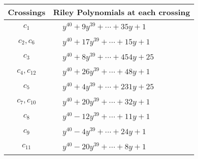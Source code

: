 \documentclass[1p]{elsarticle_modified}
\theoremstyle{definition}
\begin{document}
\begin{tabular}{m{50pt}|m{274pt}}
Crossings & \hspace{64pt}Riley Polynomials at each crossing \\
\hline $$\begin{aligned}c_{1}\end{aligned}$$&$\begin{aligned}
&y^{40}+9 y^{39}+\cdots+35 y+1
\end{aligned}$\\
\hline $$\begin{aligned}c_{2},c_{6}\end{aligned}$$&$\begin{aligned}
&y^{40}+17 y^{39}+\cdots+15 y+1
\end{aligned}$\\
\hline $$\begin{aligned}c_{3}\end{aligned}$$&$\begin{aligned}
&y^{40}+8 y^{39}+\cdots+454 y+25
\end{aligned}$\\
\hline $$\begin{aligned}c_{4},c_{12}\end{aligned}$$&$\begin{aligned}
&y^{40}+26 y^{39}+\cdots+48 y+1
\end{aligned}$\\
\hline $$\begin{aligned}c_{5}\end{aligned}$$&$\begin{aligned}
&y^{40}+4 y^{39}+\cdots+231 y+25
\end{aligned}$\\
\hline $$\begin{aligned}c_{7},c_{10}\end{aligned}$$&$\begin{aligned}
&y^{40}+20 y^{39}+\cdots+32 y+1
\end{aligned}$\\
\hline $$\begin{aligned}c_{8}\end{aligned}$$&$\begin{aligned}
&y^{40}-12 y^{39}+\cdots+11 y+1
\end{aligned}$\\
\hline $$\begin{aligned}c_{9}\end{aligned}$$&$\begin{aligned}
&y^{40}-4 y^{39}+\cdots+24 y+1
\end{aligned}$\\
\hline $$\begin{aligned}c_{11}\end{aligned}$$&$\begin{aligned}
&y^{40}-20 y^{39}+\cdots+8 y+1
\end{aligned}$\\
\hline
\end{tabular}\\~\\
\end{document}
